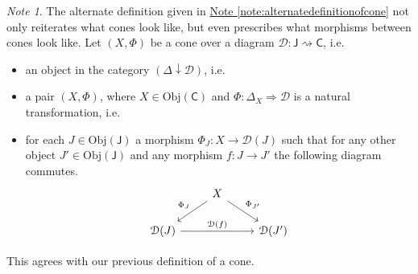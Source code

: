 \documentclass[a4paper]{report}
\newcommand{\Obj}{\mathrm{Obj}}
\theoremstyle{definition}
\theoremstyle{plain}
\theoremstyle{remark}
\newtheorem{note}{Note}[section]
\begin{document}
\begin{note}
  The alternate definition given in \hyperref[note:alternatedefinitionofcone]{Note \ref*{note:alternatedefinitionofcone}} not only reiterates what cones look like, but even prescribes what morphisms between cones look like. Let $(X, \Phi)$ be a cone over a diagram $\mathcal{D}\colon \mathsf{J} \rightsquigarrow \mathsf{C}$, i.e.
  \begin{itemize}
    \item an object in the category $(\Delta \downarrow \mathcal{D})$, i.e.
    \item a pair $(X, \Phi)$, where $X \in \Obj(\mathsf{C})$ and $\Phi\colon \Delta_{X} \Rightarrow \mathcal{D}$ is a natural transformation, i.e.
    \item for each $J \in \Obj(\mathsf{J})$ a morphism $\Phi_{J}\colon X \to \mathcal{D}(J)$ such that for any other object $J' \in \Obj(\mathsf{J})$ and any morphism $f\colon J \to J'$ the following diagram commutes.
      \begin{equation*}
        \begin{tikzcd}
          & X
          \arrow[ld, swap, "\Phi_{J}"]
          \arrow[rd, "\Phi_{J'}"]
          \\
          \mathcal{D}(J)
          \arrow[rr, "\mathcal{D}(f)"]
          & & \mathcal{D}(J')
        \end{tikzcd}
      \end{equation*}
  \end{itemize}
  This agrees with our previous definition of a cone.


\end{note}
\end{document}
